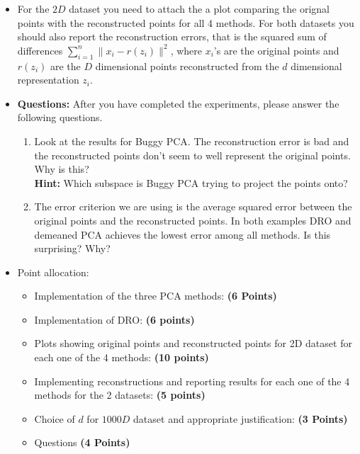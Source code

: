 \documentclass[a4paper]{article}
\theoremstyle{definition}
\begin{document}
\begin{itemize}
\item
For the $2D$ dataset you need to attach the a 
plot comparing the orignal points with the reconstructed points for all 4
methods.
For both datasets you should also report the reconstruction errors, that is the squared sum of
differences $\sum_{i=1}^n \|x_i - r(z_i)\|^2$,
where $x_i$'s are the original points and $r(z_i)$ are the $D$ dimensional points
reconstructed from the 
$d$ dimensional representation $z_i$.

\item \textbf{Questions:} After you have completed the experiments, please answer the following questions.
\begin{enumerate}
\item Look at the results for Buggy PCA. The reconstruction error is bad and the
reconstructed points don't seem to well represent the original points. Why is
this? \\
\textbf{Hint: } Which subspace is Buggy PCA trying to project the points
onto?
\item The error criterion we are using is the average squared error 
between the original points and the reconstructed points.
In both examples DRO and demeaned PCA achieves the lowest error among all
methods. 
Is this surprising? Why?
\end{enumerate}

\item Point allocation:
\begin{itemize}
\item Implementation of the three PCA methods: \textbf{(6 Points)}
\item Implementation of DRO: \textbf{(6 points)}
\item Plots showing original points and reconstructed points for 2D dataset for each one of the 4 methods: \textbf{(10 points)}
\item Implementing reconstructions and reporting results for each one of the 4 methods for the 2 datasets: \textbf{(5 points)}
\item Choice of $d$ for $1000D$ dataset and appropriate justification:
\textbf{(3 Points)}
\item Questions \textbf{(4 Points)}
\end{itemize}

\end{itemize}



\vspace{0.2in}
\end{document}
